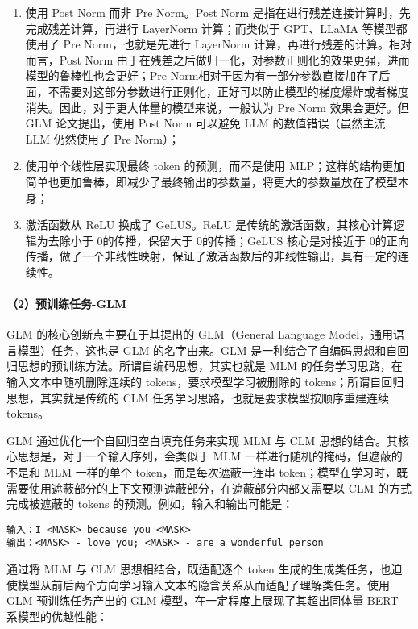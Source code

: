 \documentclass[12pt,a4paper]{book}
\begin{document}
\begin{enumerate}
\def\labelenumi{\arabic{enumi}.}
\item
  使用 Post Norm 而非 Pre Norm。Post Norm
  是指在进行残差连接计算时，先完成残差计算，再进行 LayerNorm
  计算；而类似于 GPT、LLaMA 等模型都使用了 Pre Norm，也就是先进行
  LayerNorm 计算，再进行残差的计算。相对而言，Post Norm
  由于在残差之后做归一化，对参数正则化的效果更强，进而模型的鲁棒性也会更好；Pre
  Norm相对于因为有一部分参数直接加在了后面，不需要对这部分参数进行正则化，正好可以防止模型的梯度爆炸或者梯度消失。因此，对于更大体量的模型来说，一般认为
  Pre Norm 效果会更好。但 GLM 论文提出，使用 Post Norm 可以避免 LLM
  的数值错误（虽然主流 LLM 仍然使用了 Pre Norm）；
\item
  使用单个线性层实现最终 token 的预测，而不是使用
  MLP；这样的结构更加简单也更加鲁棒，即减少了最终输出的参数量，将更大的参数量放在了模型本身；
\item
  激活函数从 ReLU 换成了 GeLUS。ReLU
  是传统的激活函数，其核心计算逻辑为去除小于 0的传播，保留大于
  0的传播；GeLUS 核心是对接近于
  0的正向传播，做了一个非线性映射，保证了激活函数后的非线性输出，具有一定的连续性。
\end{enumerate}

\paragraph{（2）预训练任务-GLM}\label{ux9884ux8badux7ec3ux4efbux52a1-glm}

GLM 的核心创新点主要在于其提出的 GLM（General Language
Model，通用语言模型）任务，这也是 GLM 的名字由来。GLM
是一种结合了自编码思想和自回归思想的预训练方法。所谓自编码思想，其实也就是
MLM 的任务学习思路，在输入文本中随机删除连续的
tokens，要求模型学习被删除的 tokens；所谓自回归思想，其实就是传统的 CLM
任务学习思路，也就是要求模型按顺序重建连续 tokens。

GLM 通过优化一个自回归空白填充任务来实现 MLM 与 CLM
思想的结合。其核心思想是，对于一个输入序列，会类似于 MLM
一样进行随机的掩码，但遮蔽的不是和 MLM 一样的单个
token，而是每次遮蔽一连串
token；模型在学习时，既需要使用遮蔽部分的上下文预测遮蔽部分，在遮蔽部分内部又需要以
CLM 的方式完成被遮蔽的 tokens 的预测。例如，输入和输出可能是：

\begin{verbatim}
输入：I <MASK> because you <MASK>
输出：<MASK> - love you; <MASK> - are a wonderful person
\end{verbatim}

通过将 MLM 与 CLM 思想相结合，既适配逐个 token
生成的生成类任务，也迫使模型从前后两个方向学习输入文本的隐含关系从而适配了理解类任务。使用
GLM 预训练任务产出的 GLM 模型，在一定程度上展现了其超出同体量 BERT
系模型的优越性能：
\end{document}
